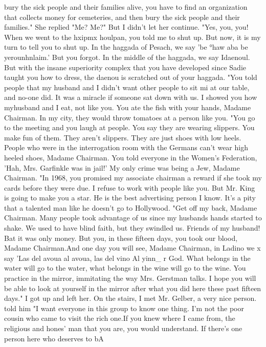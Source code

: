 bury the sick people and their families alive, you have to find an organization that 
collects money for cemeteries, and then bury the sick people and their families." 
She replied "Me? Me?" But I didn't let her continue. 
"Yes, you, you! When we went to the hxipmx houlpan, you told me to shut up. But 
now, it is my turn to tell you to shut up. In the haggada of Pesach, we say 'be 
°haw aba be yerounhnlaim.' But you forgot. In the middle of the haggada, we say 
Idaenoul. But with the insane superiority complex that you have developed since Sadie 
taught you how to dress, the daenou is scratched out of your haggada. 
"You told people that my husband and I didn't want other people to sit mi at our 
table, and no-one did. It was a miracle if someone sat down with us. I showed you 
how myhusband and I eat, not like you. You ate the fish with your hands, Madame 
Chairman. In my city, they would throw tomatoes at a person like you. 
"You go to the meeting and you laugh at people. You say they are wearing slippers. 
You make fun of them. They aren't slippers. They are just shoes with low heels. 
People who were in the interrogation room with the Germans can't wear high heeled shoes, 
Madame Chairman. You told everyone in the Women's Federation, 'Hah, Mrs. Garfinkle 
was in jail!' My only crime was being a Jew, Madame Chairman. 
"In 1968, you promised my associate chairman a reward if she took my cards before 
they were due. I refuse to work with people like you. But Mr. King is going to make 
you a star. He is the best advertising person I know. It's a pity that a talented 
man like he doesn't go to Hollywood. 
"Get off my back, Madame Chairman. Many people took advantage of us since my 
husbands hands started to shake. We used to have blind faith, but they swindled us. 
Friends of my husband! Bat it was only money. But you, in these fifteen days, you 
took our blood, Madame Chairman.And one day you will see, Madame Chairman, in Ladino we x 
say 'Las del avoua al avoua, las del vino Al yinn_ r 
God. What belongs in the water will go to the water, what belongs in the wine will go 
to the wine. You practice in the mirror, immitating the way Mrs. Gerstman talks. I 
hope you will be able to look at yourself in the mirror after what you did here these 
past fifteen days." 
I got up and left her. On the stairs, I met Mr. Gelber, a very nice person. 
told him "I want everyone in this group to know one thing. I'm not the poor cousin 
who came to visit the rich one.If you knew where I came from, the religious and hones' 
man that you are, you would understand. If there's one person here who deserves to bA 
